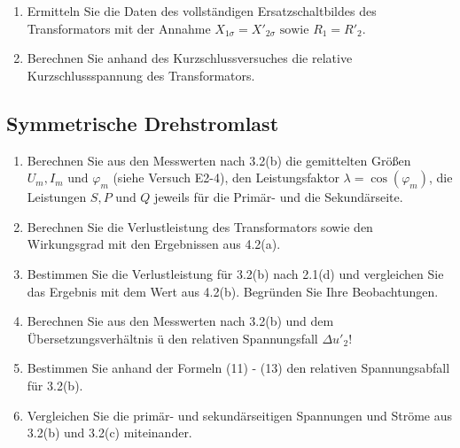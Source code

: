 \begin{enumerate}[label=\alph*)]
  \item Ermitteln Sie die Daten des vollständigen Ersatzschaltbildes des Transformators mit der Annahme $X_{1\sigma} = X'_{2\sigma} \text{ sowie } R_1 = R'_2$.

  \item Berechnen Sie anhand des Kurzschlussversuches die relative Kurzschlussspannung des Transformators. 

\end{enumerate}


\subsection{Symmetrische Drehstromlast}
\begin{enumerate}[label=\alph*)]

  \item Berechnen Sie aus den Messwerten nach 3.2(b) die gemittelten Größen $U_m, I_m \text{ und } \varphi_m$ (siehe Versuch E2-4), den Leistungsfaktor $\lambda = \cos(\varphi_m)$, die Leistungen $S, P \text{ und } Q$ jeweils für die Primär- und die Sekundärseite. 
  \item Berechnen Sie die Verlustleistung des Transformators sowie den Wirkungsgrad mit den Ergebnissen aus 4.2(a). 

  \item Bestimmen Sie die Verlustleistung für 3.2(b) nach 2.1(d) und vergleichen Sie das Ergebnis mit dem Wert aus 4.2(b). Begründen Sie Ihre Beobachtungen. 

  \item Berechnen Sie aus den Messwerten nach 3.2(b) und dem Übersetzungsverhältnis ü den relativen Spannungsfall $\Delta u'_2$!
    
  \item Bestimmen Sie anhand der Formeln (11) - (13) den relativen Spannungsabfall für 3.2(b).

  \item Vergleichen Sie die primär- und sekundärseitigen Spannungen und Ströme aus 3.2(b) und 3.2(c) miteinander. 
\end{enumerate}
